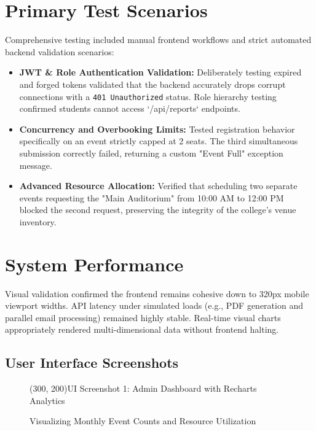 \documentclass[12pt, a4paper]{report}
\begin{document}
\section{Primary Test Scenarios}
Comprehensive testing included manual frontend workflows and strict automated backend validation scenarios:
\begin{itemize}
    \item \textbf{JWT \& Role Authentication Validation:} Deliberately testing expired and forged tokens validated that the backend accurately drops corrupt connections with a \texttt{401 Unauthorized} status. Role hierarchy testing confirmed students cannot access `/api/reports` endpoints.
    \item \textbf{Concurrency and Overbooking Limits:} Tested registration behavior specifically on an event strictly capped at 2 seats. The third simultaneous submission correctly failed, returning a custom "Event Full" exception message.
    \item \textbf{Advanced Resource Allocation:} Verified that scheduling two separate events requesting the "Main Auditorium" from 10:00 AM to 12:00 PM blocked the second request, preserving the integrity of the college's venue inventory.
\end{itemize}

\section{System Performance}
Visual validation confirmed the frontend remains cohesive down to 320px mobile viewport widths. API latency under simulated loads (e.g., PDF generation and parallel email processing) remained highly stable. Real-time visual charts appropriately rendered multi-dimensional data without frontend halting.

\vspace{1cm}
\subsection*{User Interface Screenshots}

\begin{figure}[H]
    \centering
    \framebox(300, 200){UI Screenshot 1: Admin Dashboard with Recharts Analytics}
    \caption{Visualizing Monthly Event Counts and Resource Utilization}
\end{figure}

\vspace{1cm}
\end{document}
